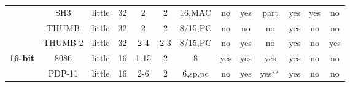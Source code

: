 \begin{sidewaystable}[tbp]
\begin{sf}
\begin{footnotesize}
\begin{center}
\begin{tabular}{|c|c||c|c|c|c|c|c|c|c|c|c|c|}
                 & %
SH3              & %
little           & %
32               & %
2                & %
2                & %
16,MAC           & %
no               & %
yes              & %
part             & %
yes              & %
yes              & %
no                 %
\\
\cline{2-13}

                 & %
THUMB            & %
little           & %
32               & %
2                & %
2                & %
8/15,PC          & %
no               & %
no               & %
no               & %
yes              & %
no               & %
no                 %
\\
\cline{2-13}

                 & %
THUMB-2          & %
little           & %
32               & %
2-4              & %
2-3              & %
8/15,PC          & %
no               & %
yes              & %
no               & %
yes              & %
no               & %
yes                %
\\
\cline{2-13}


\hline
\hline


\multirow{2}{*}{\bf 16-bit} & %
8086             & %
little           & %
16               & %
1-15             & %
2                & %
8                & %
yes              & %
yes              & %
yes 		 & %
yes              & %
no               & %
no                 %
\\
\cline{2-13}

                 & %
PDP-11           & %
little           & %
16               & %
2-6              & %
2                & %
6,sp,pc          & %
no               & %
yes              & %
yes$^{\star\star}$& %
yes              & %
no               & %
no                 %
\\
\cline{2-13}



\end{tabular}
\end{center}
\end{footnotesize}
\end{sf}
\end{sidewaystable}
